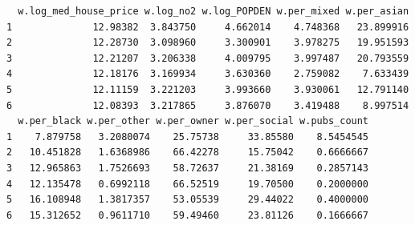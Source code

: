 \documentclass[
  letterpaper,
]{scrbook}
\newenvironment{Shaded}{\begin{snugshade}}{\end{snugshade}}
\newcommand{\AttributeTok}[1]{\textcolor[rgb]{0.40,0.45,0.13}{#1}}
\newcommand{\CommentTok}[1]{\textcolor[rgb]{0.37,0.37,0.37}{#1}}
\newcommand{\ControlFlowTok}[1]{\textcolor[rgb]{0.00,0.23,0.31}{#1}}
\newcommand{\FunctionTok}[1]{\textcolor[rgb]{0.28,0.35,0.67}{#1}}
\newcommand{\NormalTok}[1]{\textcolor[rgb]{0.00,0.23,0.31}{#1}}
\newcommand{\OtherTok}[1]{\textcolor[rgb]{0.00,0.23,0.31}{#1}}
\newcommand{\SpecialCharTok}[1]{\textcolor[rgb]{0.37,0.37,0.37}{#1}}
\newcommand{\StringTok}[1]{\textcolor[rgb]{0.13,0.47,0.30}{#1}}
\begin{document}
\begin{Shaded}
\end{Shaded}

\begin{verbatim}
  w.log_med_house_price w.log_no2 w.log_POPDEN w.per_mixed w.per_asian
1              12.98382  3.843750     4.662014    4.748368   23.899916
2              12.28730  3.098960     3.300901    3.978275   19.951593
3              12.21207  3.206338     4.009795    3.997487   20.793559
4              12.18176  3.169934     3.630360    2.759082    7.633439
5              12.11159  3.221203     3.993660    3.930061   12.791140
6              12.08393  3.217865     3.876070    3.419488    8.997514
  w.per_black w.per_other w.per_owner w.per_social w.pubs_count
1    7.879758   3.2080074    25.75738     33.85580    8.5454545
2   10.451828   1.6368986    66.42278     15.75042    0.6666667
3   12.965863   1.7526693    58.72637     21.38169    0.2857143
4   12.135478   0.6992118    66.52519     19.70500    0.2000000
5   16.108948   1.3817357    53.05539     29.44022    0.4000000
6   15.312652   0.9611710    59.49460     23.81126    0.1666667
\end{verbatim}
\end{document}
